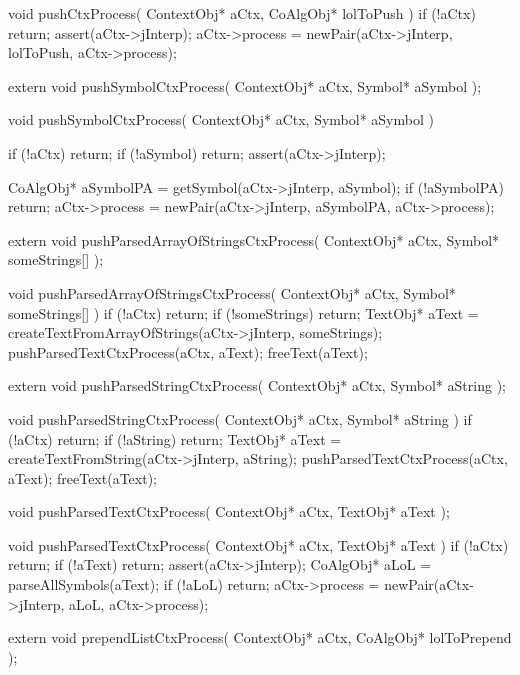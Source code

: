 \startCCode
void pushCtxProcess(
  ContextObj* aCtx,
  CoAlgObj* lolToPush
) {
  if (!aCtx) return;
  assert(aCtx->jInterp);
  aCtx->process = newPair(aCtx->jInterp, lolToPush, aCtx->process);
}
\stopCCode

\startCHeader
extern void pushSymbolCtxProcess(
  ContextObj* aCtx,
  Symbol* aSymbol
);
\stopCHeader

\startCCode
void pushSymbolCtxProcess(
  ContextObj* aCtx,
  Symbol* aSymbol
) {
  if (!aCtx) return;
  if (!aSymbol) return;
  assert(aCtx->jInterp);

  CoAlgObj* aSymbolPA =
    getSymbol(aCtx->jInterp, aSymbol);
  if (!aSymbolPA) return;
  aCtx->process = newPair(aCtx->jInterp, aSymbolPA, aCtx->process);
}
\stopCCode

\startCHeader
extern void pushParsedArrayOfStringsCtxProcess(
  ContextObj* aCtx,
  Symbol* someStrings[]
);
\stopCHeader

\startCCode
void pushParsedArrayOfStringsCtxProcess(
  ContextObj* aCtx,
  Symbol* someStrings[]
) {
  if (!aCtx) return;
  if (!someStrings) return;
  TextObj* aText =
    createTextFromArrayOfStrings(aCtx->jInterp, someStrings);
  pushParsedTextCtxProcess(aCtx, aText);
  freeText(aText);
}
\stopCCode

\startCHeader
extern void pushParsedStringCtxProcess(
  ContextObj* aCtx,
  Symbol* aString
);
\stopCHeader

\startCCode
void pushParsedStringCtxProcess(
  ContextObj* aCtx,
  Symbol* aString
) {
  if (!aCtx) return;
  if (!aString) return;
  TextObj* aText =
    createTextFromString(aCtx->jInterp, aString);
  pushParsedTextCtxProcess(aCtx, aText);
  freeText(aText);
}
\stopCCode

\startCHeader
void pushParsedTextCtxProcess(
  ContextObj* aCtx,
  TextObj* aText
);
\stopCHeader

\startCCode
void pushParsedTextCtxProcess(
  ContextObj* aCtx,
  TextObj* aText
) {
  if (!aCtx) return;
  if (!aText) return;
  assert(aCtx->jInterp);
  CoAlgObj* aLoL = parseAllSymbols(aText);
  if (!aLoL) return;
  aCtx->process = newPair(aCtx->jInterp, aLoL, aCtx->process);
}
\stopCCode

\startCHeader
extern void prependListCtxProcess(
  ContextObj* aCtx,
  CoAlgObj* lolToPrepend
);
\stopCHeader


